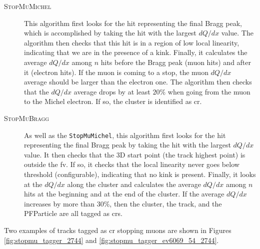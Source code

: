 \begin{description}
\item[\textsc{StopMuMichel}] This algorithm first looks for the hit representing the final Bragg peak, which is accomplished by taking the hit with the largest $dQ/dx$ value. The algorithm then checks that this hit is in a region of low local linearity, indicating that we are in the presence of a kink. Finally, it calculates the average $dQ/dx$ among $n$ hits before the Bragg peak (muon hits) and after it (electron hits). If the muon is coming to a stop, the muon $dQ/dx$ average should be larger than the electron one. The algorithm then checks that the $dQ/dx$ average drops by at least $20\%$ when going from the muon to the Michel electron. If so, the cluster is identified as \acrshort{cr}. 
\item[\textsc{StopMuBragg}] As well as the \texttt{StopMuMichel}, this algorithm first looks for the hit representing the final Bragg peak by taking the hit with the largest $dQ/dx$ value. It then checks that the 3D start point (the track highest point) is outside the \acrshort{fv}. If so, it checks that the local linearity never goes below threshold (configurable), indicating that no kink is present. Finally, it looks at the $dQ/dx$ along the cluster and calculates the average $dQ/dx$ among $n$ hits at the beginning and at the end of the cluster. If the average $dQ/dx$ increases by more than $30\%$, then the cluster, the track, and the PFParticle are all tagged as \acrshort{cr}s.
\end{description}
Two examples of tracks tagged as \acrshort{cr} stopping muons are shown in Figures \ref{fig:stopmu_tagger_2744} and \ref{fig:stopmu_tagger_ev6069_54_2744}.

